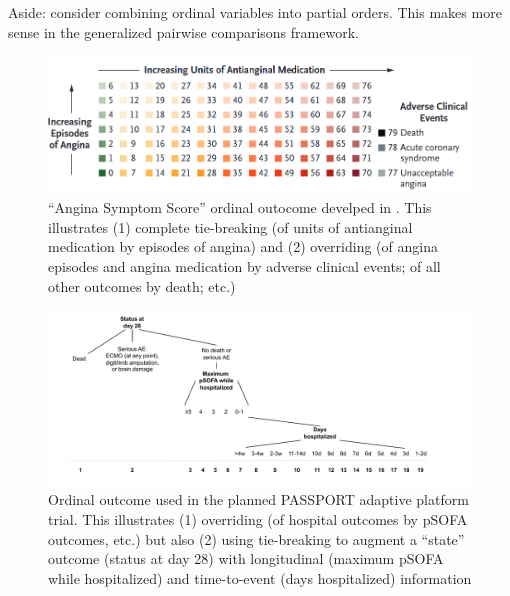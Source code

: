 \documentclass[
  11pt,
  fleqn
]{article}
\begin{document}
Aside: \citet{wittkowskiCombiningSeveralOrdinal2004} consider combining
ordinal variables into partial orders. This makes more sense in the
generalized pairwise comparisons framework.

\begin{figure}
  \includegraphics[width=6in]{rajkumar_et_al_outcome.png}
  \caption{``Angina Symptom Score'' ordinal outocome develped in
    \citep{rajkumarPlaceboControlledTrialPercutaneous2023}. This illustrates
    (1) complete tie-breaking (of units of antianginal medication by
    episodes of angina) and (2) overriding (of angina episodes and
      angina medication by adverse clinical events; of all other outcomes
  by death; etc.)}
  \label{fig:rajkumar_et_al_outcome}
\end{figure}

\begin{figure}
  \includegraphics[width=7in]{passport_ordinal_outcome_sequential.pdf}
  \caption{Ordinal outcome used in the planned PASSPORT adaptive
    platform trial. This illustrates (1) overriding (of hospital
    outcomes by pSOFA outcomes, etc.) but also (2) using tie-breaking
    to augment a ``state'' outcome (status at day 28) with
    longitudinal (maximum pSOFA while hospitalized) and time-to-event
    (days hospitalized)
  information}
  \label{fig:passport_outcome}
\end{figure}
\end{document}

